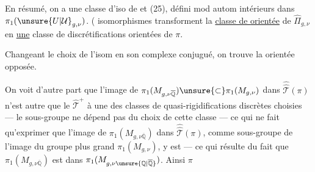 En résumé, on a une classe d'iso de  et (25), défini mod autom  intérieurs dans  $\pi_1(\unsure{U|\mathcal{U}}_{g,\nu})$. ( isomorphismes  transforment la  \uline{classe de } \uline{orientée}  de $\widehat{\Pi}_{g,\nu}$ en   \uline{une} classe de discrétifications orientées de $\pi$.




Changeant le choix de l'isom en son complexe conjugué, on trouve la   orientée opposée.

On voit d'autre part que l'image de $\pi_1(M_{g,\nu\overline{\mathbb Q}})\unsure{\subset}\pi_1(M_{g,\nu})$ dans $\widehat{\widehat{\mathcal T}}(\pi)$ n'est autre que le $\widehat{\mathcal T}^{+}$  à une  des classes de quasi-rigidifications discrètes choisies --- le sous-groupe ne dépend pas du choix de cette classe --- ce qui ne fait qu'exprimer que l'image de $\pi_1(M_{g,\nu\overline{\mathbb Q}})$ dans $\widehat{\widehat{\mathcal T}}(\pi)$,  comme sous-groupe de l'image du groupe plus grand $\pi_1(M_{g,\nu})$, y est  --- ce qui résulte du fait que $\pi_1(M_{g,\nu\overline{\mathbb Q}})$ est  dans $\pi_1(M_{g,\nu\unsure{\mathbb Q|\overline{\mathbb Q}}})$. Ainsi $\pi$

